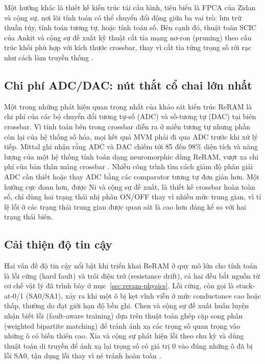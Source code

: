 \documentclass[12pt,a4paper]{article}
\begin{document}
Một hướng khác là thiết kế kiến trúc tái cấu hình, tiêu biểu là FPCA của Zidan và cộng sự, nơi lõi tính toán có thể chuyển đổi động giữa ba vai trò: lưu trữ thuần túy, tính toán tương tự, hoặc tính toán số. Bên cạnh đó, thuật toán SCIC của Ankit và cộng sự đề xuất kỹ thuật cắt tỉa mạng nơ-ron (pruning) theo cấu trúc khối phù hợp với kích thước crossbar, thay vì cắt tỉa từng trọng số rời rạc như cách làm truyền thống \cite{mittal2019}.

\subsection{Chi phí ADC/DAC: nút thắt cổ chai lớn nhất}

Một trong những phát hiện quan trọng nhất của khảo sát kiến trúc ReRAM là chi phí của các bộ chuyển đổi tương tự-số (ADC) và số-tương tự (DAC) tại biên crossbar. Vì tính toán bên trong crossbar diễn ra ở miền tương tự nhưng phần còn lại của hệ thống số hóa, mọi kết quả MVM phải đi qua ADC trước khi xử lý tiếp. Mittal ghi nhận rằng ADC và DAC chiếm tới 85 đến 98\% diện tích và năng lượng của một hệ thống tính toán dạng neuromorphic dùng ReRAM, vượt xa chi phí của bản thân mảng crossbar \cite{mittal2019}. Nhiều công trình tìm cách giảm độ phân giải ADC cần thiết hoặc thay ADC bằng các comparator tương tự đơn giản hơn. Một hướng cực đoan hơn, được Ni và cộng sự đề xuất, là thiết kế crossbar hoàn toàn số, chỉ dùng hai trạng thái nhị phân ON/OFF thay vì nhiều mức trung gian, vì tỉ lệ lỗi ở các trạng thái trung gian được quan sát là cao hơn đáng kể so với hai trạng thái biên.

\subsection{Cải thiện độ tin cậy}

Hai vấn đề độ tin cậy nổi bật khi triển khai ReRAM ở quy mô lớn cho tính toán là lỗi cứng (hard fault) và trôi điện trở (resistance drift), cả hai đều bắt nguồn từ cơ chế vật lý đã trình bày ở mục~\ref{sec:reram-physics}. Lỗi cứng, còn gọi là stuck-at-0/1 (SA0/SA1), xảy ra khi một ô bị kẹt vĩnh viễn ở mức conductance cao hoặc thấp, thường do đạt giới hạn độ bền ghi. Chen và cộng sự đề xuất huấn luyện nhận biết lỗi (fault-aware training) dựa trên thuật toán ghép cặp song phân (weighted bipartite matching) để tránh ánh xạ các trọng số quan trọng vào những ô có biến thiên cao. Xia và cộng sự phát hiện lỗi theo chu kỳ và dùng thuật toán di truyền để ánh xạ lại trọng số có giá trị 0 vào đúng những ô đã bị lỗi SA0, tận dụng lỗi thay vì né tránh hoàn toàn \cite{mittal2019}.
\end{document}
